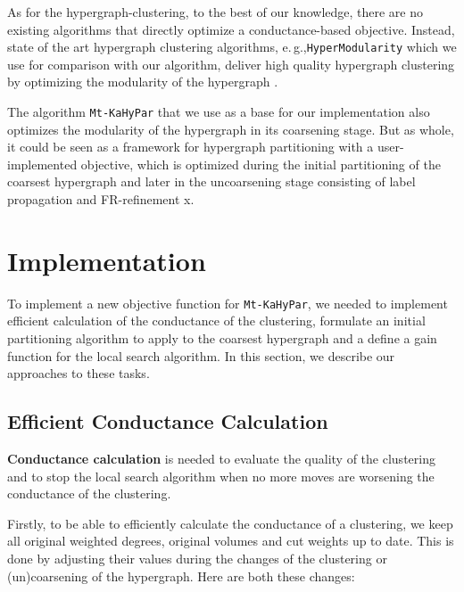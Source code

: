 \documentclass[acmsmall,nonacm,screen,review]{acmart}
\newcommand{\eg}{e.\,g.,\xspace}
\begin{document}
As for the hypergraph-clustering, to the best of our knowledge, there 
are no existing algorithms that directly optimize a conductance-based 
objective. Instead, state of the art hypergraph clustering algorithms, 
\eg \texttt{HyperModularity} which we use for comparison with our 
algorithm, deliver high quality hypergraph clustering by optimizing 
the modularity of the hypergraph 
\cite{HyperModularity,ModularityComparison}.

The algorithm \texttt{Mt-KaHyPar} that we use as a base for our 
implementation also optimizes the modularity of the hypergraph in its 
coarsening stage. But as whole, it could be seen as a framework 
for hypergraph partitioning with a user-implemented objective, which 
is optimized during the initial partitioning of the coarsest 
hypergraph and later in the uncoarsening stage consisting of label 
propagation and FR-refinement x\cite{MtKaHyPar2020}.

\section{Implementation}
\label{sec:implementation}

To implement a new objective function for \texttt{Mt-KaHyPar}, we 
needed to implement efficient calculation of the conductance of the 
clustering, formulate an initial partitioning algorithm to apply to 
the coarsest hypergraph and a define a gain function for the local 
search algorithm. In this section, we describe our approaches to
these tasks.

\subsection{Efficient Conductance Calculation}
\noindent\textbf{Conductance calculation} is needed to evaluate the
quality of the clustering and to stop the local search algorithm
when no more moves are worsening the conductance of the clustering.

Firstly, to be able to efficiently calculate the conductance of a clustering, 
we keep all original weighted degrees, original volumes and cut weights
up to date. This is done by adjusting their values during the changes of
the clustering or (un)coarsening of the hypergraph. Here are both these 
changes:
\end{document}
